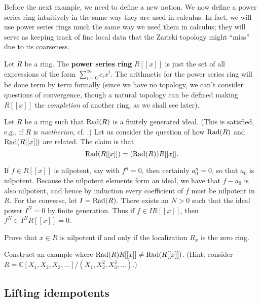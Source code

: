 Before the next example, we need to define a new notion.
We now define a power series ring intuitively in the same way they are used in
calculus. In fact, we will use power series rings much the same way we used them
in calculus; they will serve as keeping track of fine local data that the
Zariski topology might ``miss'' due to its coarseness.
\begin{definition} Let $R$ be a ring. The \textbf{power series ring} $R[[x]]$ is just the set of all
expressions of the form $\sum_{i=0}^\infty c_i x^i$. The arithmetic for the
power series ring will be done term by term formally (since we have no topology,
we can't consider questions of convergence, though a natural topology can be
defined making $R[[x]]$ the \emph{completion} of another ring, as we shall
see later). \end{definition}




\begin{example}
Let $R$ be  a ring such that $\operatorname{Rad}(R)$ is a finitely generated ideal. (This is
satisfied, e.g., if $R$ is \emph{noetherian}, cf. .)
Let us consider the question of how $\operatorname{Rad}(R)$ and $\operatorname{Rad}(R[[x]])$ are related.
The claim is that
\[ \operatorname{Rad}(R[[x]]) = (\operatorname{Rad}(R))R[[x]].  \]

If $f\in R[[x]]$ is nilpotent, say with $f^n=0$, then
certainly $a_0^n=0$, so that $a_0$ is nilpotent. Because the nilpotent elements
form an ideal, we have that $f-a_0$ is also nilpotent, and hence by induction
every coefficient of $f$ must be nilpotent in $R$. 
For the converse, let $I =
\operatorname{Rad}(R)$. There
exists an $N>0$ such that the ideal power $I^N  = 0$ by finite generation. 
Thus if $f \in IR[[x]]$, then $f^N \in I^N R[[x]] = 0$.
\end{example} 
\begin{exercise} \label{nilpcriterion} 
Prove that $x \in R$ is nilpotent if and only if the localization $R_x$ is the
zero ring.
\end{exercise} 

\begin{exercise} 
Construct an example where $\operatorname{Rad}(R) R[[x]] \neq \operatorname{Rad}(R[[x]])$. (Hint: consider
$R = \mathbb{C}[X_1, X_2, X_3, \dots]/(X_1, X_2^2, X_3^3, \dots)$.)
\end{exercise} 

\subsection{Lifting idempotents}

